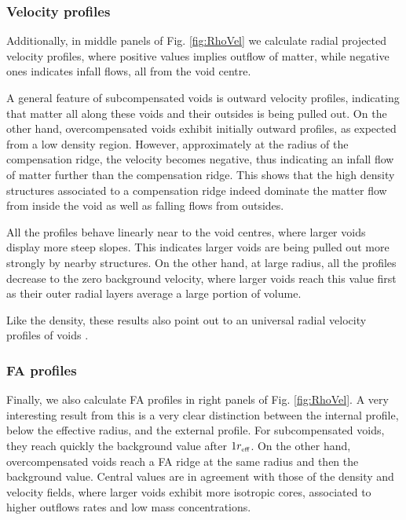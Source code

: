 \documentclass[a4,useAMS,usenatbib,usegraphicx]{mn2e}
\newcommand{\reff}{{\ifmmode{r_{\mbox{\tiny eff}}}\else{$r_{\mbox{\tiny eff}}$}\fi}}
\begin{document}
\subsubsection{Velocity profiles}
\label{subsubsec:velocity_voids}


Additionally, in middle panels of Fig. \ref{fig:RhoVel} we calculate 
radial projected velocity profiles, where positive values implies outflow 
of matter, while negative ones indicates infall flows, all from the void 
centre. 


A general feature of subcompensated voids is outward velocity profiles, 
indicating that matter all along these voids and their outsides is being 
pulled out. On the other hand, overcompensated voids exhibit initially
outward profiles, as expected from a low density region. However, 
approximately at the radius of the compensation ridge, the velocity becomes 
negative, thus indicating an infall flow of matter further than the 
compensation ridge. This shows that the high density structures associated 
to a compensation ridge indeed dominate the matter flow from inside the void 
as well as falling flows from outsides.


All the profiles behave linearly near to the void centres, where larger 
voids display more steep slopes. This indicates larger voids are being
pulled out more strongly by nearby structures. On the other hand, at 
large radius, all the profiles decrease to the zero background velocity,
where larger voids reach this value first as their outer radial layers 
average a large portion of volume.


Like the density, these results also point out to an universal radial 
velocity profiles of voids \citep{Hamaus14}.

\subsubsection{FA profiles}
\label{subsubsec:FA_voids}


Finally, we also calculate FA profiles in right panels of Fig. \ref{fig:RhoVel}.
A very interesting result from this is a very clear distinction between
the internal profile, below the effective radius, and the external profile. 
For subcompensated voids, they reach quickly the background 
value after $1\reff$. On the other hand, overcompensated voids reach a FA 
ridge at the same radius and then the background value. Central values are
in agreement with those of the density and velocity fields, where larger 
voids exhibit more isotropic cores, associated to higher outflows rates 
and low mass concentrations.
\end{document}
